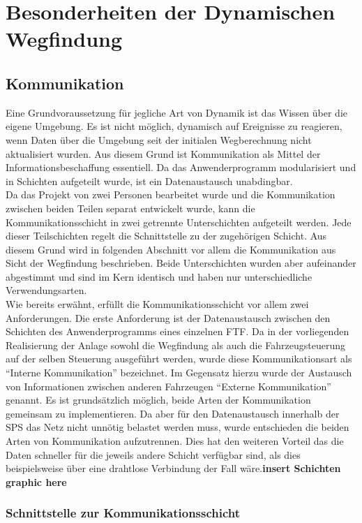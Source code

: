 \chapter{Besonderheiten der Dynamischen Wegfindung}

\section{Kommunikation}
	\label{Kommunikation}
	Eine Grundvoraussetzung für jegliche Art von Dynamik ist das Wissen über die eigene Umgebung. Es ist nicht möglich, dynamisch auf Ereignisse zu reagieren, wenn Daten über die Umgebung seit der initialen Wegberechnung nicht aktualisiert wurden. Aus diesem Grund ist Kommunikation als Mittel der Informationsbeschaffung essentiell. Da das Anwenderprogramm modularisiert und in Schichten aufgeteilt wurde, ist ein Datenaustausch unabdingbar. 
	\\
	Da das Projekt von zwei Personen bearbeitet wurde und die Kommunikation zwischen beiden Teilen separat entwickelt wurde, kann die Kommunikationsschicht in zwei getrennte Unterschichten aufgeteilt werden. Jede dieser Teilschichten regelt die Schnittstelle zu der zugehörigen Schicht. Aus diesem Grund wird in folgenden Abschnitt vor allem die Kommunikation aus Sicht der Wegfindung beschrieben. Beide Unterschichten wurden aber aufeinander abgestimmt und sind im Kern identisch und haben nur unterschiedliche Verwendungsarten.
	\\
	Wie bereits erwähnt, erfüllt die Kommunikationsschicht vor allem zwei Anforderungen. Die erste Anforderung ist der Datenaustausch zwischen den Schichten des Anwenderprogramms eines einzelnen \ac{FTF}. Da in der vorliegenden Realisierung der Anlage sowohl die Wegfindung als auch die Fahrzeugsteuerung auf der selben Steuerung ausgeführt werden, wurde diese Kommunikationsart als "`Interne Kommunikation"' bezeichnet. Im Gegensatz hierzu wurde der Austausch von Informationen zwischen anderen Fahrzeugen "`Externe Kommunikation"' genannt. Es ist grundsätzlich möglich, beide Arten der Kommunikation gemeinsam zu implementieren. Da aber für den Datenaustausch innerhalb der \ac{SPS} das Netz nicht unnötig belastet werden muss, wurde entschieden die beiden Arten von Kommunikation aufzutrennen. Dies hat den weiteren Vorteil das die Daten schneller für die jeweils andere Schicht verfügbar sind, als dies beispielsweise über eine drahtlose Verbindung der Fall wäre.\textbf{insert Schichten graphic here}
	
	\subsection{Schnittstelle zur Kommunikationsschicht}
		
